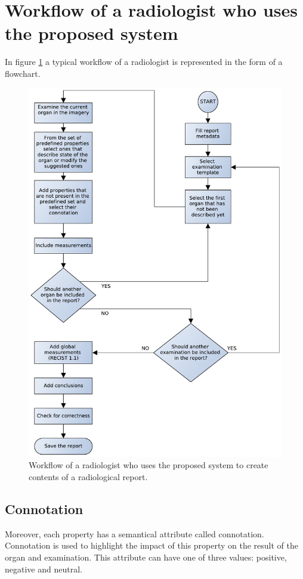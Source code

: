 \documentclass[12pt, twoside, openany]{report}
\theoremstyle{definition}
\begin{document}
\section{Workflow of a radiologist who uses the proposed system}
In figure \ref{fig:report-workflow} a typical workflow of a radiologist is represented in the form of a flowchart. 
\begin{figure}
	\centering
	\includegraphics[width=\linewidth]{report-workflow.pdf}
	\caption{Workflow of a radiologist who uses the proposed system to create contents of a radiological report.
		\label{fig:report-workflow}
	}
\end{figure}


\subsection{Connotation}
Moreover, each property has a semantical attribute called connotation. Connotation is used to highlight the impact of this property on the result of the organ and examination. This attribute can have one of three values: positive, negative and neutral. 
\end{document}
